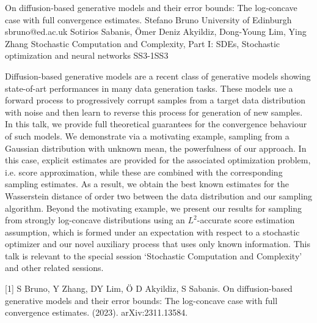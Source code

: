 \begin{talk}
  {On diffusion-based generative models and their error bounds: The log-concave case with full convergence estimates.}%
  {Stefano Bruno}%
  {University of Edinburgh}%
  {sbruno@ed.ac.uk}%
  {Sotirios Sabanis, {\"O}mer Deniz Akyildiz, Dong-Young Lim, Ying Zhang}%
{Stochastic Computation and Complexity, Part I: SDEs, Stochastic optimization and neural networks}
{}{SS3-1}{SS3}


				
				

Diffusion-based generative models are a recent class of generative models showing state-of-art performances in many data generation tasks. These models use a forward process to progressively corrupt samples from a target data distribution with noise and then learn to reverse this process for generation of new samples. In this talk, we provide full theoretical guarantees for the convergence behaviour of such models. We demonstrate via a motivating example, sampling from a Gaussian distribution with unknown mean, the powerfulness of our approach.  In this case, explicit estimates are provided for the associated optimization problem, i.e. score approximation, while these are combined with the corresponding sampling estimates. As a result,  we obtain the best known estimates for the Wasserstein distance of order two between the data distribution and our sampling algorithm. Beyond the motivating example, we present our results for sampling from strongly log-concave distributions using an $L^2$-accurate score estimation assumption, which is formed under an expectation with respect to a stochastic optimizer and our novel auxiliary process that uses only known information. This talk is relevant to the special session ‘Stochastic Computation and Complexity’ and other related sessions.

\medskip

[1] S Bruno, Y Zhang, DY Lim, {\"O} D Akyildiz, S Sabanis. On diffusion-based generative models and their error bounds: The log-concave case with full convergence estimates. (2023).	arXiv:2311.13584. 
\end{talk}

